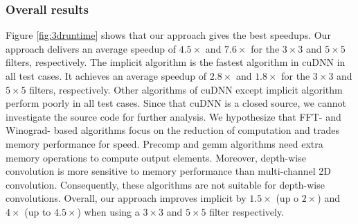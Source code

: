 \subsubsection{Overall results}
Figure \ref{fig:3druntime} shows that our approach gives the best speedups. Our approach delivers an average speedup of $4.5\times$ and
$7.6\times$ for the $3 \times 3$ and $5 \times 5$ filters, respectively. The implicit algorithm is the fastest algorithm in cuDNN in all
test cases. It achieves an average speedup of $2.8\times$ and $1.8\times$ for the $3 \times 3$ and $5 \times 5$ filters, respectively.
Other algorithms of cuDNN except implicit algorithm perform poorly in all test cases. Since that cuDNN is a closed source, we cannot
investigate the source code for further analysis. We hypothesize that FFT- and Winograd- based algorithms focus on the reduction of computation
and trades memory performance for speed. Precomp and gemm algorithms need extra memory operations to compute output elements. Moreover,
depth-wise convolution is more sensitive to memory performance than multi-channel 2D convolution. Consequently, these algorithms are not suitable for
depth-wise convolutions. Overall, our approach improves implicit by $1.5\times$ (up o $2\times$) and $4\times$ (up to $4.5\times$)
when using a $3 \times 3$ and $5 \times 5$ filter respectively.

%

